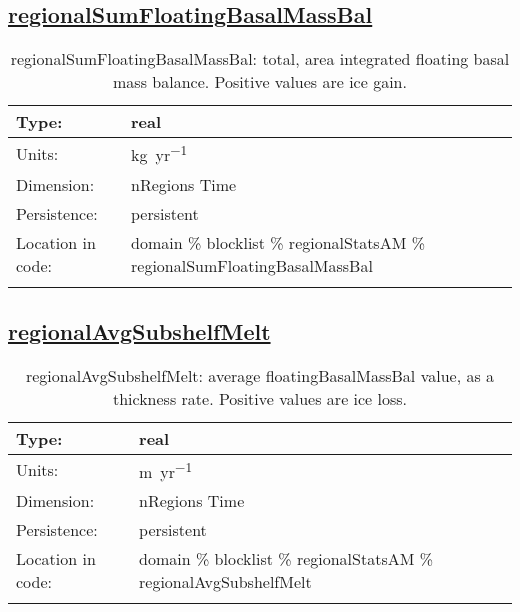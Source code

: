 \subsection[regionalSumFloatingBasalMassBal]{\hyperref[sec:var_tab_regionalStatsAM]{regionalSumFloatingBasalMassBal}}
\label{subsec:var_sec_regionalStatsAM_regionalSumFloatingBasalMassBal}
\begin{center}
\begin{longtable}{| p{2.0in} | p{4.0in} |}
        \hline 
        Type: & real \\
        \hline 
        Units: & \si{kg.yr^{-1}} \\
        \hline 
        Dimension: & nRegions Time \\
        \hline 
        Persistence: & persistent \\
        \hline 
         Location in code: & domain \% blocklist \% regionalStatsAM \% regionalSumFloatingBasalMassBal \\
         \hline 
    \caption{regionalSumFloatingBasalMassBal: total, area integrated floating basal mass balance. Positive values are ice gain.}
\end{longtable}
\end{center}
\subsection[regionalAvgSubshelfMelt]{\hyperref[sec:var_tab_regionalStatsAM]{regionalAvgSubshelfMelt}}
\label{subsec:var_sec_regionalStatsAM_regionalAvgSubshelfMelt}
\begin{center}
\begin{longtable}{| p{2.0in} | p{4.0in} |}
        \hline 
        Type: & real \\
        \hline 
        Units: & \si{m.yr^{-1}} \\
        \hline 
        Dimension: & nRegions Time \\
        \hline 
        Persistence: & persistent \\
        \hline 
         Location in code: & domain \% blocklist \% regionalStatsAM \% regionalAvgSubshelfMelt \\
         \hline 
    \caption{regionalAvgSubshelfMelt: average floatingBasalMassBal value, as a thickness rate. Positive values are ice loss.}
\end{longtable}
\end{center}
